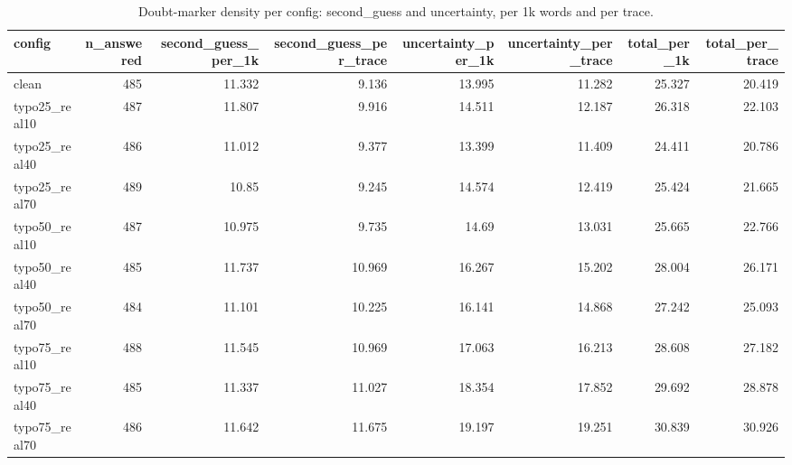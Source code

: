 \documentclass[11pt]{article}
\begin{document}
\begin{table}[H]
\centering
\caption{Doubt-marker density per config: second\_guess and uncertainty, per 1k words and per trace.}
\small
\begin{adjustbox}{max width=\textwidth}
\begin{tabular}{lrrrrrrr}
\toprule
\textbf{config} & \textbf{n\_answered} & \textbf{second\_guess\_per\_1k} & \textbf{second\_guess\_per\_trace} & \textbf{uncertainty\_per\_1k} & \textbf{uncertainty\_per\_trace} & \textbf{total\_per\_1k} & \textbf{total\_per\_trace} \\
\midrule
clean & 485 & 11.332 & 9.136 & 13.995 & 11.282 & 25.327 & 20.419 \\
typo25\_real10 & 487 & 11.807 & 9.916 & 14.511 & 12.187 & 26.318 & 22.103 \\
typo25\_real40 & 486 & 11.012 & 9.377 & 13.399 & 11.409 & 24.411 & 20.786 \\
typo25\_real70 & 489 & 10.85 & 9.245 & 14.574 & 12.419 & 25.424 & 21.665 \\
typo50\_real10 & 487 & 10.975 & 9.735 & 14.69 & 13.031 & 25.665 & 22.766 \\
typo50\_real40 & 485 & 11.737 & 10.969 & 16.267 & 15.202 & 28.004 & 26.171 \\
typo50\_real70 & 484 & 11.101 & 10.225 & 16.141 & 14.868 & 27.242 & 25.093 \\
typo75\_real10 & 488 & 11.545 & 10.969 & 17.063 & 16.213 & 28.608 & 27.182 \\
typo75\_real40 & 485 & 11.337 & 11.027 & 18.354 & 17.852 & 29.692 & 28.878 \\
typo75\_real70 & 486 & 11.642 & 11.675 & 19.197 & 19.251 & 30.839 & 30.926 \\
\bottomrule
\end{tabular}
\end{adjustbox}
\end{table}
\end{document}
